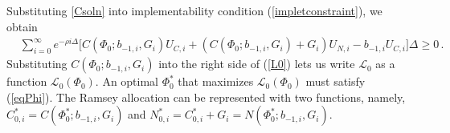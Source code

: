 \documentclass[12pt]{article}
\DeclareMathOperator*{\argmax}{arg\,max}
\newcommand{\NW}[1]{{\textcolor{blue}{#1}}}
\newcommand{\WJ}[1]{{\textcolor{red}{#1}}}
\begin{document}
Substituting  \eqref{Csoln} into  implementability condition (\ref{impletconstraint}), we obtain
\begin{align}\label{eqPhi}
	& \sum_{i=0}^{\infty} e^{-\rho i\Delta} \big[ C(\Phi_0; b_{-1, i}, G_{i})U_{C, i}+(C(\Phi_0; b_{-1, i}, G_{i})+G_i)U_{N, i}-b_{-1, i} U_{C, i} \big]\Delta \geq  0\,.
\end{align}
Substituting  $C(\Phi_0; b_{-1, i}, G_{i})$ into the right side of   (\ref{L0}) lets us  write  $\mathcal L_0$ as a function %
$\mathcal{L}_0(\Phi_0)$. 
An optimal  $\Phi_0^{*}$ that maximizes $\mathcal{L}_0(\Phi_0)$ must satisfy (\ref{eqPhi}). 
The Ramsey allocation can be represented with two functions, namely,  $C_{0, i}^*=C(\Phi_0^{*}; b_{-1, i}, G_{i})$ and $N_{0, i}^* = C_{0, i}^*+G_{i} = N(\Phi_0^{*}; b_{-1, i}, G_{i})$. 


\end{document}
